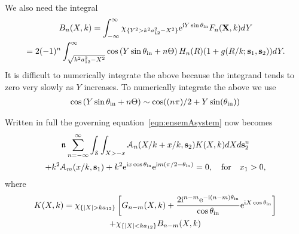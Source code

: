 \documentclass[12pt, a4paper]{article}
\begin{document}
We also need the integral
\begin{multline}
  B_n(X,k) = \int_{-\infty}^{\infty} \chi_{\{ Y^2> k^2 a_{12}^2 - X^2\}} \textrm{e}^{\textrm{i} Y \sin\theta_{\mathrm{in}}}
   F_{n}(\mathbf X,k) d Y
  \\
  = 2(-1)^{n} \int_{\sqrt{k^2 a_{12}^2 - X^2}}^\infty \cos \left( Y \sin\theta_{\mathrm{in}} +  n \Theta\right) H_{n}(R)( 1 + g(R/k;  \mathbf s_1,\mathbf s_2)) d Y.
\end{multline}
It is difficult to numerically integrate the above because the integrand tends to zero very slowly as $Y$ increases. To numerically integrate the above we use
\begin{multline}
  \cos \left( Y \sin\theta_{\mathrm{in}} +  n \Theta\right) \sim \cos((n \pi)/2 + Y \sin(\theta_{\mathrm{in}}))
\end{multline}


Written in full the governing equation~\eqref{eqn:ensemAsystem} now becomes
\begin{multline}
 \mathfrak n_{} \sum_{n=-\infty}^\infty \int_\mathcal S
  \int_{X> -x} \mathcal A_n (X/k + x/k, \mathbf s_2) K(X,k) dX
  d\mathbf s_2^n
\\
+  k^2 \mathcal A_m (x/k, \mathbf s_1)   + k^2  \textrm{e}^{\textrm{i} x \cos \theta_{\mathrm{in}}} \textrm{e}^{\textrm{i} m ( \pi/2 - \theta_{\mathrm{in}} )}
   = 0, \quad \text{for} \quad x_1 >0,
  \label{eqn:ensemAsystem2}
\end{multline}
where
\begin{multline}
K(X,k) =   \chi_{\{ |X|> k a_{12}\}} \left [G_{n-m}(X, k) + \frac{2 \ii^{n-m} \ee^{-\ii(n-m) \theta_\inc}}{\cos \theta_\inc} \ee^{\ii X \cos \theta_\inc } \right ]
\\ + \chi_{\{ |X|< k a_{12}\}}   B_{n-m}(X,k)
\label{eqn:kernel}
\end{multline}


\printbibliography

% 
% 
\end{document}
